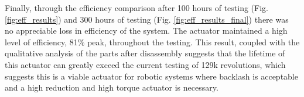 Finally, through the efficiency comparison after 100 hours of testing (Fig. \ref{fig:eff_results}) and 300 hours of testing (Fig. \ref{fig:eff_results_final}) there was no appreciable loss in efficiency of the system. The actuator maintained a high level of efficiency, 81\% peak, throughout the testing. This result, coupled with the qualitative analysis of the parts after disassembly suggests that the lifetime of this actuator can greatly exceed the current testing of 129k revolutions, which suggests this is a viable actuator for robotic systems where backlash is acceptable and a high reduction and high torque actuator is necessary. 


